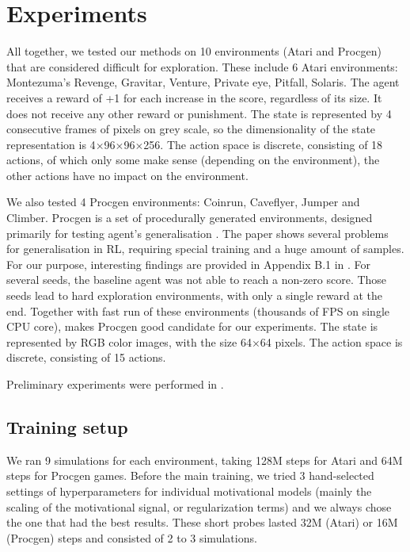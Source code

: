 \documentclass[a4paper,11pt]{elsarticle}
\begin{document}
\section{Experiments}
\label{sec:exper}

All together, we tested our methods on 10 environments (Atari and Procgen) that are considered difficult for exploration.
These include 6 Atari environments: Montezuma's Revenge, Gravitar, Venture, Private eye, Pitfall, Solaris. The agent receives a reward of +1 for each increase in the score, regardless of its size. It does not receive any other reward or punishment. The state is represented by 4 consecutive frames of pixels on grey scale, so the dimensionality of the state representation is 4$\times$96$\times$96$\times$256. The action space is discrete, consisting of 18 actions, of which only some make sense (depending on the environment), the other actions have no impact on the environment.

We also tested 4 Procgen environments: Coinrun, Caveflyer, Jumper and Climber. Procgen is a set of procedurally generated environments, designed primarily for testing agent's generalisation \citep{cobbe2020procgen}. The paper shows several problems for generalisation in RL, requiring special training and a huge amount of samples. For our purpose, interesting findings are provided in Appendix B.1 in \citep{cobbe2020procgen}. For several seeds, the baseline agent was not able to reach a non-zero score. Those seeds lead to hard exploration environments, with only a single reward at the end. Together with fast run of these environments (thousands of FPS on single CPU core), makes Procgen good candidate for our experiments. The state is represented by RGB color images, with the size 64$\times$64 pixels. The action space is discrete, consisting of 15 actions.

Preliminary experiments were performed in \citep{pechac2022intrinsic}.

\subsection{Training setup}

We ran 9 simulations for each environment, taking 128M steps for Atari and 64M steps for Procgen games. Before the main training, we tried 3 hand-selected settings of hyperparameters for individual motivational models (mainly the scaling of the motivational signal, or regularization terms) and we always chose the one that had the best results. These short probes lasted 32M (Atari) or 16M (Procgen) steps and consisted of 2 to 3 simulations. 
\end{document}
